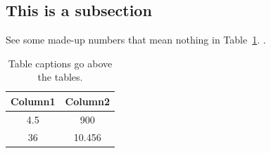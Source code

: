 \documentclass[nosmallcaps]{csuthesis} %
\begin{document}
\subsection{This is a subsection}
See some made-up numbers that mean nothing in Table~\ref{table1}. \lipsum[4-5].

\begin{table}[htbp]
\caption{Table captions go above the tables.} \label{table1}
\begin{tabular}{|c| c|}
\hline
Column1 & Column2 \\
\hline
4.5 & 900 \\
36 & 10.456 \\
\hline
\end{tabular}
\end{table}

\lipsum[6-8]


\FloatBarrier %

\newpage


\end{document}
